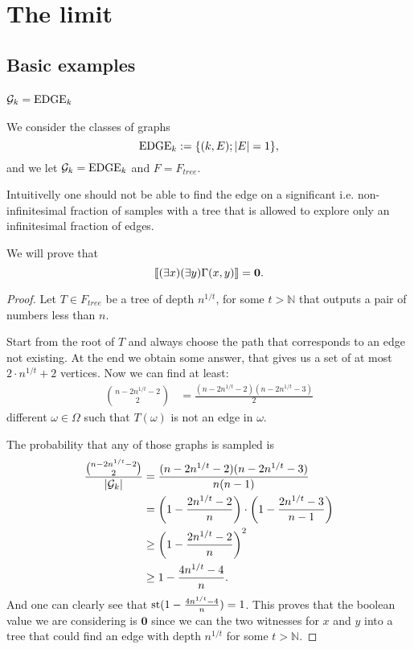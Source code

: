\chapter{The limit}
\section{Basic examples}
\subsection{$\mathcal{G}_k=\text{EDGE}_k$}
We consider the classes of graphs
\[\text{EDGE}_k:=\{\text{$(k,E); \left|{E}\right|=1$}\},\]
and we let $\mathcal{G}_k=\text{EDGE}_k$ and $F=F_{tree}$.

Intuitivelly one should not be able to find the edge on a significant i.e. non-infinitesimal fraction of samples with a tree that is allowed to explore only an infinitesimal fraction of edges.

\begin{thrm}\label{thrmedge}
We will prove that \[\llbracket(\exists x)(\exists y)\Gamma(x,y)\rrbracket=\textbf{0}.\]
\end{thrm}
\begin{proof}
Let $T\in F_{tree}$ be a tree of depth $n^{1/t}$, for some $t>\mathbb{N}$ that outputs a pair of numbers less than $n$.

Start from the root of $T$ and always choose the path that corresponds to an edge not existing. At the end we obtain some answer, that gives us a set of at most $2 \cdot n^{1/t}+2$ vertices. Now we can find at least: 
\begin{align}
\binom{n-2n^{1/t}-2}{2}&=\frac{(n-2n^{1/t}-2)(n-2n^{1/t}-3)}{2}
\end{align}
different $\omega\in\Omega$ such that $T(\omega)$ is not an edge in $\omega$. 

The probability that any of those graphs is sampled is
\begin{align}
\frac{\binom{n-2n^{1/t}-2}{2}}{\left|{\mathcal{G}_k}\right|}&=\frac{(n-2n^{1/t}-2)(n-2n^{1/t}-3)}{n(n-1)}\\
&=\left(1-\frac{2n^{1/t}-2}{n}\right)\cdot\left(1-\frac{2n^{1/t}-3}{n-1}\right)\\
&\geq \left(1-\frac{2n^{1/t}-2}{n}\right)^2\\
&\geq 1-\frac{4n^{1/t}-4}{n}.
\end{align}
And one can clearly see that $\text{st}(1-\frac{4n^{1/t}-4}{n})=1$. This proves that the boolean value we are considering is $\textbf{0}$ since we can the two witnesses for $x$ and $y$ into a tree that could find an edge with depth $n^{1/t}$ for some $t>\mathbb{N}$.
\end{proof}

